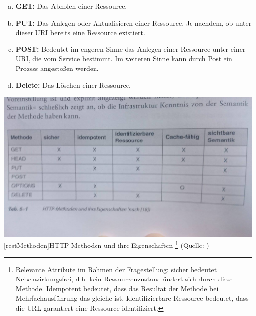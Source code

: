 \documentclass[12pt,a4paper,bibliography=totocnumbered,listof=totoc]{scrartcl}
\begin{document}
\begin{compactitem}
\begin{enumerate}[a.]
\item \textbf{GET:} Das Abholen einer Ressource.
\item \textbf{PUT:} Das Anlegen oder Aktualisieren einer Ressource. Je nachdem, ob unter dieser URI bereits eine Ressource existiert.
\item \textbf{POST:} Bedeutet im engeren Sinne das Anlegen einer Ressource unter einer URI, die vom Service bestimmt. Im weiteren Sinne kann durch Post ein Prozess angestoßen werden.
\item \textbf{Delete:} Das Löschen einer Ressource.
\end{enumerate}

\vspace{1em}
\begin{minipage}{\linewidth}
	\centering
	\includegraphics[width=0.7\linewidth]{Abbildungen/restMethoden.jpg}
	[restMethoden]{HTTP-Methoden und ihre Eigenschaften
	\footnote{Relevante Attribute im Rahmen der Fragestellung: \glqq sicher\grqq{} bedeutet Nebenwirkungsfrei, d.h. kein Ressourcenzustand ändert sich durch diese Methode. \glqq Idempotent\grqq{} bedeutet, dass das Resultat der Methode bei Mehrfachausführung das gleiche ist. \glqq Identifizierbare Ressource\grqq{} bedeutet, dass die URL garantiert eine Ressource identifiziert.}
	(Quelle: \citet{tilkov11})}
	\label{fig:restMethoden}
\end{minipage}
\vspace{1em}


\end{compactitem}
\end{document}
